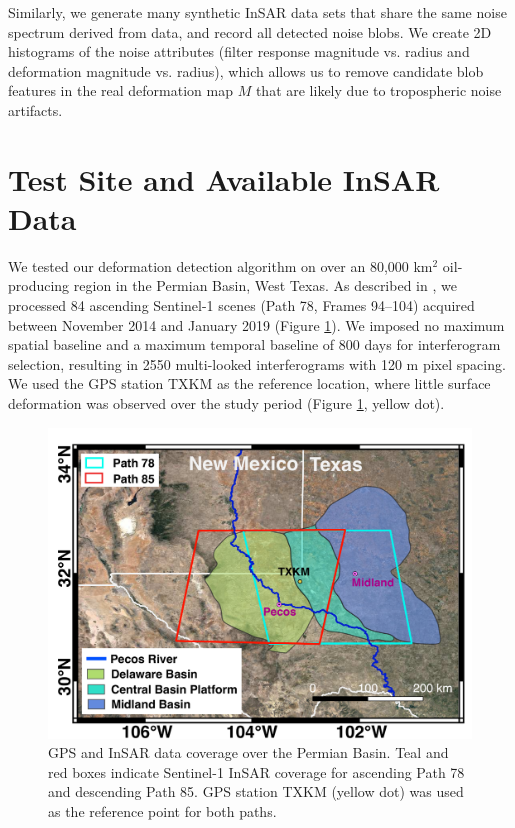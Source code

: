 Similarly, we generate many synthetic InSAR data sets that share the same noise spectrum derived from data, and record all detected noise blobs. We create 2D histograms of the noise attributes (filter response magnitude vs. radius and deformation magnitude vs. radius), which allows us to remove candidate blob features in the real deformation map $M$ that are likely due to tropospheric noise artifacts.


\section{Test Site and Available InSAR Data}
\label{sec:site}

We tested our deformation detection algorithm on over an 80,000 km$^2$ oil-producing region in the Permian Basin, West Texas.  As described in \cite{Staniewicz2020InsarRevealsComplex}, we processed 84 ascending Sentinel-1 scenes (Path 78, Frames 94–104) acquired between November 2014 and January 2019 (Figure \ref{fig:study-area}). We imposed no maximum spatial baseline and a maximum temporal baseline of 800 days for interferogram selection, resulting in 2550 multi-looked interferograms with 120 m pixel spacing.  We used the GPS station TXKM as the reference location, where little surface deformation was observed over the study period (Figure \ref{fig:study-area}, yellow dot).



\begin{figure}[hbt!]
	\centering
	\includegraphics[width=0.59\linewidth]{figures/chapter6-blobs/figure4-study-area.pdf}
	\caption{GPS and InSAR data coverage over the Permian Basin. Teal and red boxes indicate Sentinel-1 InSAR coverage for ascending Path 78 and descending Path 85. GPS station TXKM (yellow dot) was used as the reference point for both paths.
	}
	\label{fig:study-area}
\end{figure}




